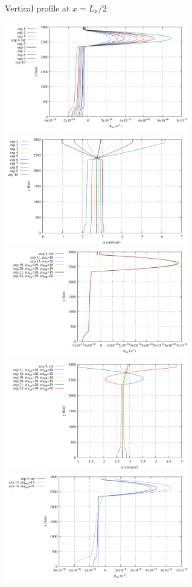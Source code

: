 \newpage

Vertical profile at $x=L_x/2$

\begin{center}
\includegraphics[width=8cm]{python_codes/fieldstone_148/results/fig1_exx_middle}
\includegraphics[width=8cm]{python_codes/fieldstone_148/results/fig1_u_middle}\\
\includegraphics[width=8cm]{python_codes/fieldstone_148/results/fig2_exx_middle}
\includegraphics[width=8cm]{python_codes/fieldstone_148/results/fig2_u_middle}\\
\includegraphics[width=8cm]{python_codes/fieldstone_148/results/fig3_exx_middle}

\end{center}

